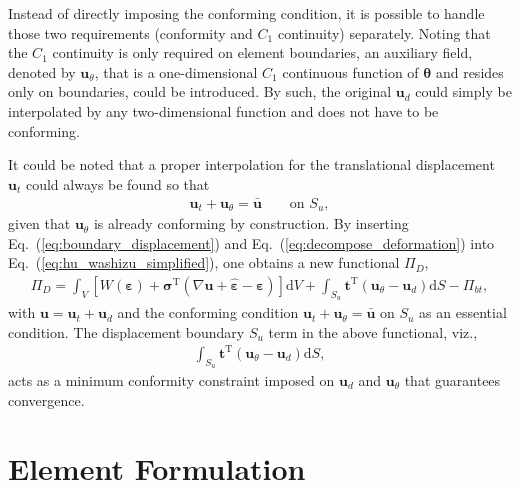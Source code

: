 \documentclass[3p,sort&compress,review,11pt]{elsarticle}
\newcommand*{\md}[1]{\mathrm{d}#1}
\newcommand*{\mT}{\mathrm{T}}
\newcommand*{\eqsref}[1]{Eq.~(\ref{#1})}
\newcommand*{\mb}{\bm}
\begin{document}
Instead of directly imposing the conforming condition, it is possible to handle those two requirements (conformity and $C_1$ continuity) separately. Noting that the $C_1$ continuity is only required on element boundaries, an auxiliary field, denoted by $\mb{u}_\theta$, that is a one-dimensional $C_1$ continuous function of $\mb{\theta}$ and resides only on boundaries, could be introduced. By such, the original $\mb{u}_d$ could simply be interpolated by any two-dimensional function and does not have to be conforming.

It could be noted that a proper interpolation for the translational displacement $\mb{u}_t$ could always be found so that
\begin{gather}\label{eq:boundary_displacement}
\mb{u}_t+\mb{u}_\theta=\bar{\mb{u}}\qquad\text{on $S_u$},
\end{gather}
given that $\mb{u}_\theta$ is already conforming by construction. By inserting \eqsref{eq:boundary_displacement} and \eqsref{eq:decompose_deformation} into \eqsref{eq:hu_washizu_simplified}, one obtains a new functional $\varPi_D$,
\begin{gather}\label{eq:modified_principle}
\varPi_D=\int_V\left[W\left(\mb{\varepsilon}\right)+\mb{\sigma}^\mT\left(\nabla\mb{u}+\hat{\mb{\varepsilon}}-\mb{\varepsilon}\right)\right]\md{V}+\int_{S_u}\mb{t}^\mT\left(\mb{u}_\theta-\mb{u}_d\right)\md{S}-\varPi_{bt},
\end{gather}
with $\mb{u}=\mb{u}_t+\mb{u}_d$ and the conforming condition $\mb{u}_t+\mb{u}_\theta=\bar{\mb{u}}$ on $S_u$ as an essential condition. The displacement boundary $S_u$ term in the above functional, viz.,
\begin{gather}\label{eq:constraint}
\int_{S_u}\mb{t}^\mT\left(\mb{u}_\theta-\mb{u}_d\right)\md{S},
\end{gather}
acts as a minimum conformity constraint imposed on $\mb{u}_d$ and $\mb{u}_\theta$ that guarantees convergence.
\section{Element Formulation}
\end{document}
